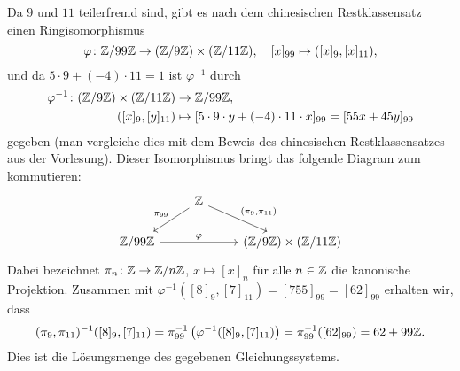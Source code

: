 \documentclass[a4paper,10pt,numbers=noenddot]{scrartcl}
\begin{document}
Da $9$ und $11$ teilerfremd sind, gibt es nach dem chinesischen Restklassensatz einen Ringisomorphismus
\[
          \varphi
  \colon  \mathbb{Z}/99\mathbb{Z} \to     (\mathbb{Z}/9\mathbb{Z}) \times (\mathbb{Z}/11\mathbb{Z}),
  \quad   [x]_{99}            \mapsto ([x]_9, [x]_{11}),
\]
und da $5 \cdot 9 + (-4) \cdot 11 = 1$ ist $\varphi^{-1}$ durch
\begin{align*}
          \varphi^{-1}
  \colon  (\mathbb{Z}/9\mathbb{Z}) \times (\mathbb{Z}/11\mathbb{Z}) &\to      \mathbb{Z}/99\mathbb{Z},
  \\
          ([x]_9, [y]_{11})                                 &\mapsto  [5 \cdot 9 \cdot y + (-4) \cdot 11 \cdot x]_{99}
                                                             =        [55 x + 45 y]_{99}
\end{align*}
gegeben (man vergleiche dies mit dem Beweis des chinesischen Restklassensatzes aus der Vorlesung).
Dieser Isomorphismus bringt das folgende Diagram zum kommutieren:
\begin{equation}
  \label{eqn: commutative diagram}
  \begin{tikzcd}
      {}
    & \Integer
      \arrow[swap]{dl}{\pi_{99}}
      \arrow{dr}{(\pi_9, \pi_{11})}
    & {}
    \\
      \Integer/99\Integer
      \arrow{rr}{\varphi}
    & {}
   & (\Integer/9\Integer) \times (\Integer/11\Integer)
  \end{tikzcd}
\end{equation}
Dabei bezeichnet $\pi_n \colon \mathbb{Z} \to \mathbb{Z}/n\mathbb{Z}$, $x \mapsto [x]_n$ für alle $n \in \mathbb{Z}$ die kanonische Projektion.
Zusammen mit $\varphi^{-1}([8]_9, [7]_{11}) = [755]_{99} = [62]_{99}$ erhalten wir, dass
\[
    (\pi_{9}, \pi_{11})^{-1}([8]_{9}, [7]_{11})
  = \pi_{99}^{-1}\left( \varphi^{-1}([8]_{9}, [7]_{11}) \right)
  = \pi_{99}^{-1}( [62]_{99} )
  = 62 + 99 \mathbb{Z}.
\]
Dies ist die Lösungsmenge des gegebenen Gleichungssystems.
\end{document}
